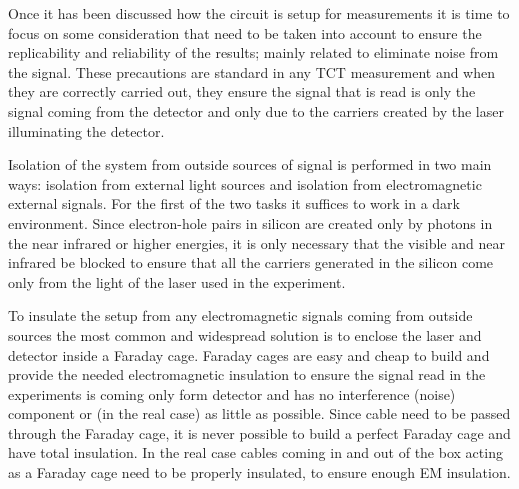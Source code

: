 Once it has been discussed how the circuit is setup for measurements it is time to focus on some consideration that need to be taken into account to ensure the replicability and reliability of the results; mainly related to eliminate noise from the signal. These precautions are standard in any TCT measurement and when they are correctly carried out, they ensure the signal that is read is  only the signal coming from the detector and only due to the carriers created by the laser illuminating the detector.

Isolation of the system from outside sources of signal is performed in two main ways: isolation from external light sources and isolation from electromagnetic external signals. For the first of the two tasks it suffices to work in a dark environment. Since electron-hole pairs in silicon are created only by photons in the near infrared or higher energies, it is only necessary that the visible and near infrared be blocked to ensure that all the carriers generated in the silicon come only from the light of the laser used in the experiment.

To insulate the setup from any electromagnetic signals coming from outside sources the most common and widespread solution is to enclose the laser and detector inside a Faraday cage. Faraday cages are easy and cheap to build and provide the needed electromagnetic insulation to ensure the signal read in the experiments is coming only form detector and has no interference (noise) component or (in the real case) as little as possible. Since cable need to be passed through the Faraday cage, it is never possible to build a perfect Faraday cage and have total insulation. In the real case cables coming in and out of the box acting as a Faraday cage need to be properly insulated, to ensure enough EM insulation.

